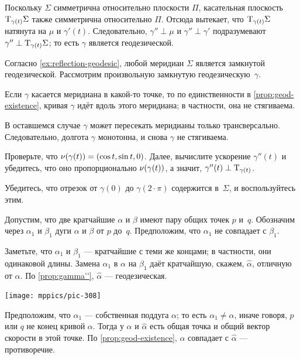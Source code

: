 \begin{multicols}{2}
Поскольку $\Sigma$ симметрична относительно плоскости $\Pi$,
касательная плоскость $\mathrm{T}_{\gamma(t)}\Sigma$ также симметрична относительно $\Pi$.
Отсюда вытекает, что $\mathrm{T}_{\gamma(t)}\Sigma$ натянута на $\mu$ и $\gamma'(t)$.
Следовательно, $\gamma''\perp \mu$ и $\gamma''\perp\gamma'$ подразумевают $\gamma''\perp\mathrm{T}_{\gamma(t)}\Sigma$;
то есть $\gamma$ является геодезической.

Согласно \ref{ex:reflection-geodesic}, любой меридиан $\Sigma$ является замкнутой геодезической.
Рассмотрим произвольную замкнутую геодезическую~$\gamma$.

Если $\gamma$ касается меридиана в какой-то точке, то по единственности в \ref{prop:geod-existence}, кривая $\gamma$ идёт вдоль этого меридиана;
в частности, она не стягиваема.

В оставшемся случае $\gamma$ может пересекать меридианы только трансверсально.
Следовательно, долгота $\gamma$ монотонна, и снова $\gamma$ не стягиваема.

Проверьте, что $\Norm(\gamma(t))\z=(\cos t,\sin t, 0)$.
Далее, вычислите ускорение $\gamma''(t)$ и убедитесь, что оно пропорционально $\nu(\gamma(t))$,
а значит, $\gamma''(t)\z\perp\T_{\gamma(t)}$. 

Убедитесь, что отрезок от $\gamma (0)$ до $\gamma (2{\cdot}\pi)$ содержится в~$\Sigma$,
и воспользуйтесь этим.

Допустим, что две кратчайшие $\alpha$ и $\beta$ имеют пару общих точек $p$ и~$q$.
Обозначим через $\alpha_1$ и $\beta_1$ дуги $\alpha$ и $\beta$ от $p$ до~$q$.
Предположим, что $\alpha_1$ не совпадает с $\beta_1$.

Заметьте, что $\alpha_1$ и $\beta_1$ --- кратчайшие с теми же концами;
в частности, они одинаковой длины.
Замена $\alpha_1$ в $\alpha$ на $\beta_1$ даёт кратчайшую, скажем, $\hat\alpha$, отличную от $\alpha$.
По \ref{prop:gamma''}, $\hat\alpha$ --- геодезическая.

\begin{Figure}
\vskip-0mm
\centering
\texttt{[image: mppics/pic-308]}
\vskip0mm
\end{Figure}

Предположим, что $\alpha_1$ --- собственная поддуга $\alpha$;
то есть $\alpha_1\ne\alpha$, иначе говоря, $p$ или $q$ не конец кривой $\alpha$.
Тогда у $\alpha$ и $\hat\alpha$ есть общая точка и общий вектор скорости в этой точке.
По \ref{prop:geod-existence}, $\alpha$ совпадает с $\hat\alpha$ --- противоречие.


\end{multicols}
